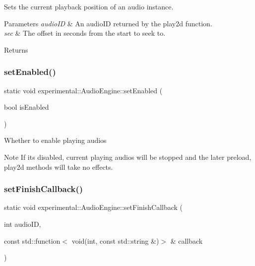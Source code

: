 Sets the current playback position of an audio instance.


\begin{DoxyParams}{Parameters}
{\em audio\+ID} & An audio\+ID returned by the play2d function. \\
\hline
{\em sec} & The offset in seconds from the start to seek to. \\
\hline
\end{DoxyParams}
\begin{DoxyReturn}{Returns}

\end{DoxyReturn}
\mbox{\label{classexperimental_1_1AudioEngine_ae004f7785eb2ad3aa31db7db912d4622}} 
\subsubsection{\texorpdfstring{set\+Enabled()}{setEnabled()}}
{\footnotesize\ttfamily static void experimental\+::\+Audio\+Engine\+::set\+Enabled (\begin{DoxyParamCaption}\item[{bool}]{is\+Enabled }\end{DoxyParamCaption})\hspace{0.3cm}{\ttfamily [static]}}

Whether to enable playing audios \begin{DoxyNote}{Note}
If it\textquotesingle{}s disabled, current playing audios will be stopped and the later \textquotesingle{}preload\textquotesingle{}, \textquotesingle{}play2d\textquotesingle{} methods will take no effects. 
\end{DoxyNote}
\mbox{\label{classexperimental_1_1AudioEngine_a641027899b3a5145093c4db1fae2d1ed}} 
\subsubsection{\texorpdfstring{set\+Finish\+Callback()}{setFinishCallback()}\hspace{0.1cm}{\footnotesize\ttfamily [1/2]}}
{\footnotesize\ttfamily static void experimental\+::\+Audio\+Engine\+::set\+Finish\+Callback (\begin{DoxyParamCaption}\item[{int}]{audio\+ID,  }\item[{const std\+::function$<$ void(int, const std\+::string \&)$>$ \&}]{callback }\end{DoxyParamCaption})\hspace{0.3cm}{\ttfamily [static]}}

